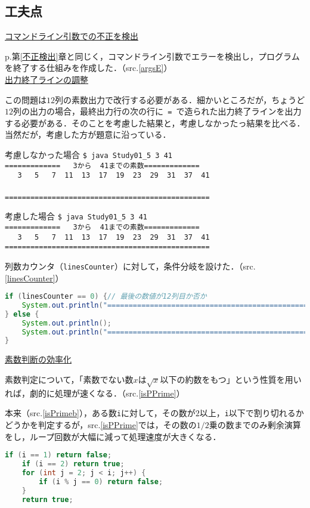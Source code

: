 \documentclass[a4j,11pt]{jsarticle}
\begin{document}
\subsection{工夫点}
\noindent\underline{コマンドライン引数での不正を検出}\par
p.\pageref{不正検出}第\ref{不正検出}章と同じく，コマンドライン引数でエラーを検出し，プログラムを終了する仕組みを作成した．（src.\ref{argsE}）\\
\noindent\underline{出力終了ラインの調整}\par
この問題は$12$列の素数出力で改行する必要がある．細かいところだが，ちょうど$12$列の出力の場合，最終出力行の次の行に\verb| = |で造られた出力終了ラインを出力する必要がある．そのことを考慮した結果と，考慮しなかったっ結果を比べる．
当然だが，考慮した方が題意に沿っている．
\begin{itembox}[l]{考慮しなかった場合}
        \verb|$ java Study01_5 3 41| \\
        \verb|=============   3から  41までの素数=============|\\
        \verb|   3   5   7  11  13  17  19  23  29  31  37  41|\\\\
        \verb|================================================|
\end{itembox}
\begin{itembox}[l]{考慮した場合}
    \verb|$ java Study01_5 3 41| \\
    \verb|=============   3から  41までの素数=============|\\
    \verb|   3   5   7  11  13  17  19  23  29  31  37  41|\\
    \verb|================================================|
\end{itembox}
列数カウンタ（\verb|linesCounter|）に対して，条件分岐を設けた．（src.\ref{linesCounter}）
\begin{lstlisting}[caption=列数カウンタによる条件分岐, label=linesCounter, language=Java]
if (linesCounter == 0) {// 最後の数値が12列目か否か
    System.out.println("================================================");
} else {
    System.out.println();
    System.out.println("================================================");
}
\end{lstlisting}

\noindent\underline{素数判断の効率化}\par
素数判定について，「素数でない数$x$は$\sqrt{x}$以下の約数をもつ」という性質を用いれば，劇的に処理が速くなる．（src.\ref{isPPrime}）\par
本来（src.\ref{isPrimeb}），ある数\verb|i|に対して，その数が$2$以上，\verb|i|以下で割り切れるかどうかを判定するが，src.\ref{isPPrime}では，その数の$1/2$乗の数までのみ剰余演算をし，ループ回数が大幅に減って処理速度が大きくなる．
\begin{lstlisting}[caption=素数判定の基本, label=isPrimeb, language=Java]
    if (i == 1) return false;
    if (i == 2) return true;
    for (int j = 2; j < i; j++) {
        if (i % j == 0) return false;
    }
    return true;
\end{lstlisting}
\end{document}
